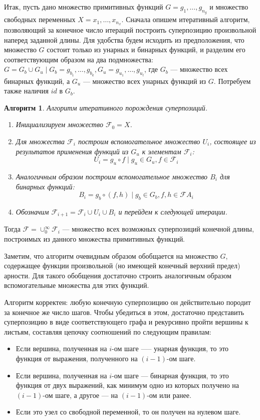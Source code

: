\documentclass[12pt,a4paper]{amsart}
\newtheorem{algo}{Алгоритм}
\begin{document}
Итак, пусть дано множество примитивных функций $G = { g_1, \dots, g_{n_g} }$ и
множество свободных переменных $X = { x_1, \dots, x_{n_x} }$. Сначала
опишем итеративный алгоритм, позволяющий за конечное число итераций
построить суперпозицию произвольной наперед заданной длины. Для удобства
будем исходить из предположения, что множество $G$ состоит только из унарных
и бинарных функций, и разделим его соответствующим образом на два
подмножества:
$G = G_b \cup G_u \mid G_b = { g_{b_1}, \dots, g_{b_k} }, G_u = { g_{u_1}, \dots, g_{u_l} }$,
где $G_b$ --- множество всех бинарных функций, а $G_u$ --- множество всех
унарных функций из $G$. Потребуем также наличия $id$ в $G_b$.

\begin{algo}
  Алгоритм итеративного порождения суперпозиций.
  \begin{enumerate}
	\item Инициализируем множество $\mathcal{F}_0 = X$.
	\item Для множества $\mathcal{F}_i$ построим вспомогательное множество $U_i$,
	  состоящее из результатов применения функций из $G_u$ к элементам $\mathcal{F}_i$:
	  \[
	  U_i = { g_u \circ f \mid g_u \in G_u, f \in \mathcal{F}_i }
	  \]
	\item Аналогичным образом построим вспомогательное множество $B_i$ для
	  бинарных функций:
	  \[
	  B_i = { g_b \circ (f, h) \mid g_b \in G_b, f, h \in \mathcal{F}A_i }
	  \]
	\item Обозначим $\mathcal{F}_{i+1} = \mathcal{F}_i \cup U_i \cup B_i$ и
	  перейдем к следующей итерации.
  \end{enumerate}
\end{algo}

Тогда $\mathcal{F} = \cup_0^\infty \mathcal{F}_i$ --- множество всех
возможных суперпозиций конечной длины, построимых из данного множества
примитивных функций.

Заметим, что алгоритм очевидным образом обобщается на множество $G$,
содержащее функции произвольной (но имеющей конечный верхний предел)
арности. Для такого обобщения достаточно строить аналогичным образом
вспомогательные множества для этих функций.

Алгоритм корректен: любую конечную суперпозицию он действительно породит
за конечное же число шагов. Чтобы убедиться в этом, достаточно представить
суперпозицию в виде соответствующего графа и рекурсивно пройти вершины к
листьям, составляя цепочку соотношений по следующим правилам:

\begin{itemize}
  \item Если вершина, полученная на $i$-ом шаге —-- унарная функция, то
	это функция от выражения, полученного на $(i-1)$-ом шаге.
  \item Если вершина, полученная на $i$-ом шаге --- бинарная функция, то
	это функция от двух выражений, как минимум одно из которых получено
	на $(i-1)$-ом шаге, а другое --- на $(i-1)$-ом или ранее.
  \item Если это узел со свободной переменной, то он получен на нулевом
	шаге.
\end{itemize}
\end{document}
